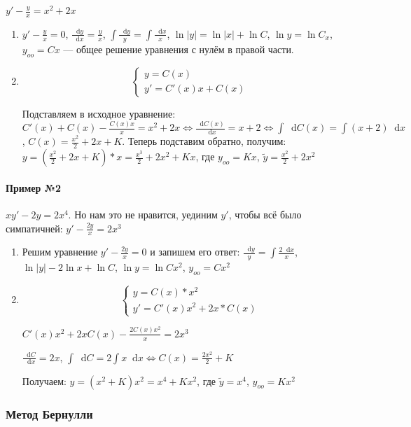 \documentclass{article}
\newcommand*\diff{\mathop{}\!\mathrm{d}}
\begin{document}
$y' - \frac{y}{x} = x^2 + 2x$

\begin{enumerate}
    \item $y' - \frac{y}{x} = 0$, $\frac{\diff y}{\diff x} = \frac{y}{x}$, $\int \frac{\diff y}{y} = \int \frac{\diff x}{x}$, $\ln |y| = \ln |x| + \ln C$, $\ln y = \ln C_x$, $y_{oo} = Cx$ — общее решение уравнения с нулём в правой части.
    \item $$
    \begin{cases}
        y = C(x) \\
        y' = C'(x) x + C(x)
    \end{cases}$$

    Подставляем в исходное уравнение: $C'(x) + C(x) - \frac{C(x) x}{x} = x^2 + 2x \Longleftrightarrow \frac{\diff C(x)}{\diff x} = x + 2 \Longleftrightarrow \int \diff C(x) = \int (x + 2) \diff x$, $C(x) = \frac{x^2}{2} + 2x + K$. Теперь подставим обратно, получим: $y = (\frac{x^2}{2} + 2x + K) * x = \frac{x^3}{2} + 2x^2 + Kx$, где $y_{oo} = Kx$, $\tilde{y} = \frac{x^2}{2} + 2x^2$
\end{enumerate}

\paragraph{Пример №2}

$x y' - 2y = 2x^4$. Но нам это не нравится, уединим $y'$, чтобы всё было симпатичней: $y' - \frac{2y}{x} = 2x^3$

\begin{enumerate}
    \item Решим уравнение $y' - \frac{2y}{x} = 0$ и запишем его ответ: $\frac{\diff y}{y} = \int \frac{2 \diff x}{x}$, $\ln |y| - 2 \ln x + \ln C$, $\ln y = \ln C x^2$, $y_{oo} = Cx^2$
    \item $$\begin{cases}
        y = C(x) * x^2 \\
        y' = C'(x) x^2 + 2x * C(x)
    \end{cases}$$

    $C'(x) x^2 + 2x C(x) - \frac{2 C(x) x^2}{x} = 2x^3$

    $\frac{\diff C}{\diff x} = 2x$, $\int \diff C = 2 \int x \diff x \Longleftrightarrow C(x) = \frac{2x^2}{2} + K$

    Получаем: $y = (x^2 + K) x^2 = x^4 + Kx^2$, где $\tilde{y} = x^4$, $y_{oo} = Kx^2$
\end{enumerate}

\subsubsection{Метод Бернулли}
\end{document}
